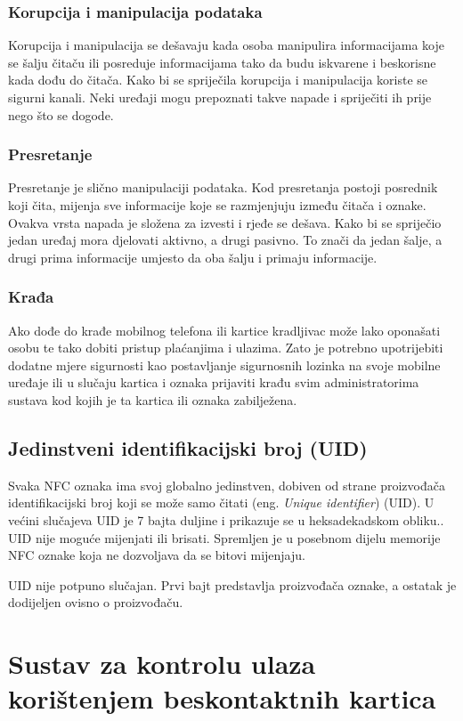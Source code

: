 \documentclass[times, utf8, zavrsni]{fer}
\begin{document}
\subsection{Korupcija i manipulacija podataka}
Korupcija i manipulacija se dešavaju kada osoba manipulira informacijama koje se šalju čitaču ili posreduje informacijama tako da budu iskvarene i beskorisne kada dođu do čitača. Kako bi se spriječila korupcija i manipulacija koriste se sigurni kanali. Neki uređaji mogu prepoznati takve napade i spriječiti ih prije nego što se dogode.
\subsection{Presretanje}
Presretanje je slično manipulaciji podataka. Kod presretanja postoji posrednik koji čita, mijenja sve informacije koje se razmjenjuju između čitača i oznake. Ovakva vrsta napada je složena za izvesti i rjeđe se dešava. Kako bi se spriječio jedan uređaj mora djelovati aktivno, a drugi pasivno. To znači da jedan šalje, a drugi prima informacije umjesto da oba šalju i primaju informacije.
\subsection{Krađa}
Ako dođe do krađe mobilnog telefona ili kartice kradljivac može lako oponašati osobu te tako dobiti pristup plaćanjima i ulazima. Zato je potrebno upotrijebiti dodatne mjere sigurnosti kao postavljanje sigurnosnih lozinka na svoje mobilne uređaje ili u slučaju kartica i oznaka prijaviti krađu svim administratorima sustava kod kojih je ta kartica ili oznaka zabilježena. \citep{6}

\section{Jedinstveni identifikacijski broj (UID)}
Svaka NFC oznaka ima svoj globalno jedinstven, dobiven od strane proizvođača identifikacijski broj koji se može samo čitati (eng. \textit{Unique identifier}) (UID). U većini slučajeva UID je 7 bajta duljine i prikazuje se u heksadekadskom obliku.. UID nije moguće mijenjati ili brisati. Spremljen je u posebnom dijelu memorije NFC oznake koja ne dozvoljava da se bitovi mijenjaju. \par 
UID nije potpuno slučajan. Prvi bajt predstavlja proizvođača oznake, a ostatak je dodijeljen ovisno o proizvođaču.
\citep{7}

\chapter{Sustav za kontrolu ulaza korištenjem beskontaktnih kartica}
\end{document}
